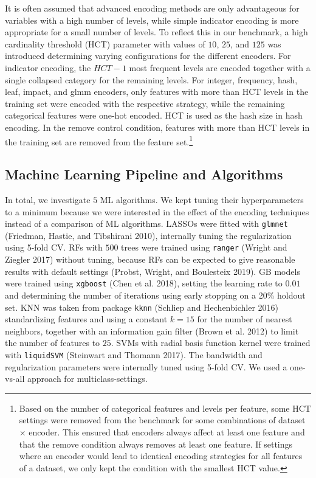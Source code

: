 \documentclass[smallextended]{svjour3}       %
\begin{document}
It is often assumed that advanced encoding methods are only advantageous for variables with a high number of levels, while simple indicator encoding is more appropriate for a small number of levels.
To reflect this in our benchmark, a high cardinality threshold (HCT) parameter with values of \(10\), \(25\), and \(125\) was introduced determining varying configurations for the different encoders.
For indicator encoding, the \(HCT - 1\) most frequent levels are encoded together with a single collapsed category for the remaining levels.
For integer, frequency, hash, leaf, impact, and glmm encoders, only features with more than HCT levels in the training set were encoded with the respective strategy, while the remaining categorical features were one-hot encoded. HCT is used as the hash size in hash encoding.
In the remove control condition, features with more than HCT levels in the training set are removed from the feature set.\footnote{Based on the number of categorical features and levels per feature, some HCT settings were removed from the benchmark for some combinations of dataset $\times$ encoder.
This ensured that encoders always affect at least one feature and that the remove condition always removes at least one feature.
If settings where an encoder would lead to identical encoding strategies for all features of a dataset, we only kept the condition with the smallest HCT value.}

\hypertarget{machine-learning-pipeline-and-algorithms}{%
\subsection{Machine Learning Pipeline and Algorithms}\label{machine-learning-pipeline-and-algorithms}}

\label{sec:pipeline}

In total, we investigate \(5\) ML algorithms. We kept tuning their hyperparameters to a minimum because we were interested in the effect of the encoding techniques instead of a comparison of ML algorithms.
LASSOs were fitted with \texttt{glmnet} (Friedman, Hastie, and Tibshirani 2010), internally tuning the regularization using 5-fold CV.
RFs with \(500\) trees were trained using \texttt{ranger} (Wright and Ziegler 2017) without tuning, because RFs can be expected to give reasonable results with default settings (Probst, Wright, and Boulesteix 2019).
GB models were trained using \texttt{xgboost} (Chen et al. 2018), setting the learning rate to \(0.01\) and determining the number of iterations using early stopping on a 20\% holdout set.
KNN was taken from package \texttt{kknn} (Schliep and Hechenbichler 2016) standardizing features and using a constant \(k=15\) for the number of nearest neighbors, together with an information gain filter (Brown et al. 2012) to limit the number of features to \(25\).
SVMs with radial basis function kernel were trained with \texttt{liquidSVM} (Steinwart and Thomann 2017).
The bandwidth and regularization parameters were internally tuned using 5-fold CV. We used a one-vs-all approach for multiclass-settings.
\end{document}
